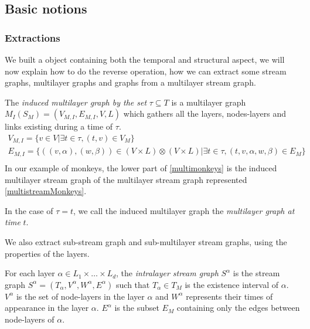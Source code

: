 \documentclass{svproc}
\begin{document}
%
\subsection{Basic notions}
%
\subsubsection{Extractions}

We built a object containing both the temporal and structural aspect, we will now explain how to do the reverse operation, how we can extract some stream graphs, multilayer graphs and graphs from a multilayer stream graph.

\begin{definition}
    The {\em induced multilayer graph by the set } $\tau \subseteq T$ is a multilayer graph $M_I(S_M)=(V_{M,I}, E_{M,I}, V,L)$ which gathers all the layers, nodes-layers and links existing during a time of $\tau$.
    \begin{align*}
    	V_{M,I} = \{ v \in V | \exists t \in \tau, (t,v) \in V_M\}\\
    	E_{M,I} = \{((v,\alpha),(w,\beta)) \in (V\times L)\otimes (V\times L) | \exists t \in \tau , (t,v,\alpha,w,\beta) \in E_M \} \\
    \end{align*}
    In our example of monkeys, the lower part of \cref{multimonkeys} is the induced multilayer stream graph of the multilayer stream graph represented \cref{multistreamMonkeys}.
\end{definition}

In the case of $\tau={t}$, we call the induced multilayer graph the {\em multilayer graph at time} $t$.

We also extract sub-stream graph and sub-multilayer stream graphs, using the properties of the layers.

\begin{definition}	
	For each layer $\alpha \in L_1 \times \dots \times L_d$, the {\em intralayer stream graph} $S^{\alpha}$ is the stream graph $S^{\alpha}=(T_{\alpha},V^{\alpha},W^{\alpha},E^{\alpha})$ such that $ T_{\alpha} \in T_M$ is the existence interval of $\alpha$. $V^{\alpha}$ is the set of node-layers in the layer $\alpha$ and $W^{\alpha}$ represents their times of appearance in the layer $\alpha$. $E^{\alpha}$ is the subset $E_M$ containing only the edges between node-layers of $\alpha$.
	\end{definition}
	
\end{document}
